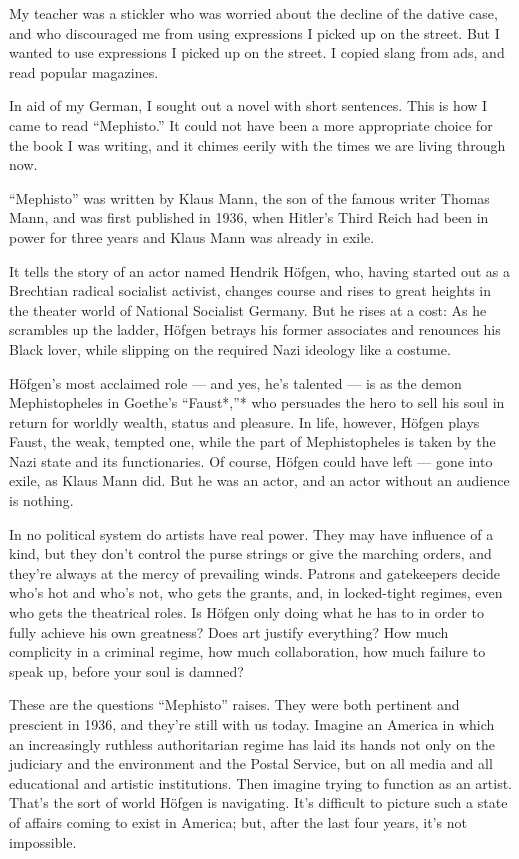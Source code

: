 My teacher was a stickler who was worried about the decline of the
dative case, and who discouraged me from using expressions I picked up
on the street. But I wanted to use expressions I picked up on the
street. I copied slang from ads, and read popular magazines.

In aid of my German, I sought out a novel with short sentences. This is
how I came to read ``Mephisto.'' It could not have been a more
appropriate choice for the book I was writing, and it chimes eerily with
the times we are living through now.

``Mephisto'' was written by Klaus Mann, the son of the famous writer
Thomas Mann, and was first published in 1936, when Hitler's Third Reich
had been in power for three years and Klaus Mann was already in exile.

It tells the story of an actor named Hendrik Höfgen, who, having started
out as a Brechtian radical socialist activist, changes course and rises
to great heights in the theater world of National Socialist Germany. But
he rises at a cost: As he scrambles up the ladder, Höfgen betrays his
former associates and renounces his Black lover, while slipping on the
required Nazi ideology like a costume.

Höfgen's most acclaimed role --- and yes, he's talented --- is as the
demon Mephistopheles in Goethe's ``Faust*,''* who persuades the hero to
sell his soul in return for worldly wealth, status and pleasure. In
life, however, Höfgen plays Faust, the weak, tempted one, while the part
of Mephistopheles is taken by the Nazi state and its functionaries. Of
course, Höfgen could have left --- gone into exile, as Klaus Mann did.
But he was an actor, and an actor without an audience is nothing.

In no political system do artists have real power. They may have
influence of a kind, but they don't control the purse strings or give
the marching orders, and they're always at the mercy of prevailing
winds. Patrons and gatekeepers decide who's hot and who's not, who gets
the grants, and, in locked-tight regimes, even who gets the theatrical
roles. Is Höfgen only doing what he has to in order to fully achieve his
own greatness? Does art justify everything? How much complicity in a
criminal regime, how much collaboration, how much failure to speak up,
before your soul is damned?

These are the questions ``Mephisto'' raises. They were both pertinent
and prescient in 1936, and they're still with us today. Imagine an
America in which an increasingly ruthless authoritarian regime has laid
its hands not only on the judiciary and the environment and the Postal
Service, but on all media and all educational and artistic institutions.
Then imagine trying to function as an artist. That's the sort of world
Höfgen is navigating. It's difficult to picture such a state of affairs
coming to exist in America; but, after the last four years, it's not
impossible.


